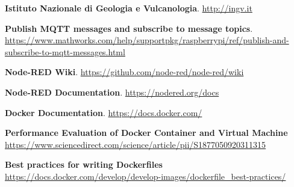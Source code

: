 \documentclass[a4paper,10pt]{memoir}
\begin{document}
\begin{thebibliography}{9}

  \textbf{Istituto Nazionale di Geologia e Vulcanologia}.
  \href{http://ingv.it}{http://ingv.it}

  \textbf{Publish MQTT messages and subscribe to message topics}.\\
  \href{https://www.mathworks.com/help/supportpkg/raspberrypi/ref/publish-and-subscribe-to-mqtt-messages.html}{https://www.mathworks.com/help/supportpkg/raspberrypi/ref/publish-and-subscribe-to-mqtt-messages.html}

  \textbf{Node-RED Wiki}.
  \href{https://github.com/node-red/node-red/wiki}{https://github.com/node-red/node-red/wiki}

  \textbf{Node-RED Documentation}.
  \href{https://nodered.org/docs}{https://nodered.org/docs}

  \textbf{Docker Documentation}.
  \href{https://docs.docker.com/}{https://docs.docker.com/}

    \textbf{Performance Evaluation of Docker Container and Virtual Machine}
    \\
    \href{https://www.sciencedirect.com/science/article/pii/S1877050920311315}{https://www.sciencedirect.com/science/article/pii/S1877050920311315}

    \textbf{Best practices for writing Dockerfiles}
    \\
    \href{https://docs.docker.com/develop/develop-images/dockerfile_best-practices/}{https://docs.docker.com/develop/develop-images/dockerfile\_best-practices/}

\end{thebibliography}
\end{document}
